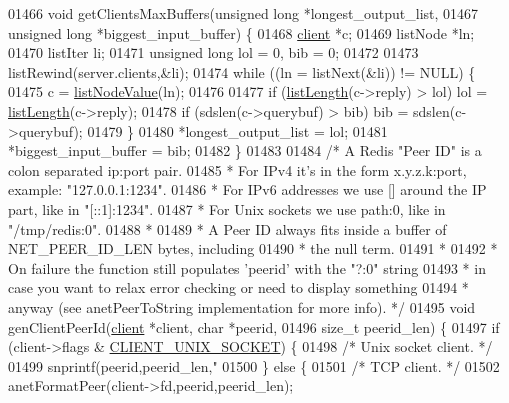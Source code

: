 \begin{DoxyCode}
{{{{{{{{{{{{{{{{{01466 \textcolor{keywordtype}{void} getClientsMaxBuffers(\textcolor{keywordtype}{unsigned} \textcolor{keywordtype}{long} *longest\_output\_list,
01467                           \textcolor{keywordtype}{unsigned} \textcolor{keywordtype}{long} *biggest\_input\_buffer) \{
01468     \hyperlink{structclient}{client} *c;
01469     listNode *ln;
01470     listIter li;
01471     \textcolor{keywordtype}{unsigned} \textcolor{keywordtype}{long} lol = 0, bib = 0;
01472 
01473     listRewind(server.clients,&li);
01474     \textcolor{keywordflow}{while} ((ln = listNext(&li)) != NULL) \{
01475         c = \hyperlink{adlist_8h_af84cae230e7180ebcda1e2736fce9f65}{listNodeValue}(ln);
01476 
01477         \textcolor{keywordflow}{if} (\hyperlink{adlist_8h_afde0ab079f934670e82119b43120e94b}{listLength}(c->reply) > lol) lol = \hyperlink{adlist_8h_afde0ab079f934670e82119b43120e94b}{listLength}(c->reply);
01478         \textcolor{keywordflow}{if} (sdslen(c->querybuf) > bib) bib = sdslen(c->querybuf);
01479     \}
01480     *longest\_output\_list = lol;
01481     *biggest\_input\_buffer = bib;
01482 \}
01483 
01484 \textcolor{comment}{/* A Redis "Peer ID" is a colon separated ip:port pair.}
01485 \textcolor{comment}{ * For IPv4 it's in the form x.y.z.k:port, example: "127.0.0.1:1234".}
01486 \textcolor{comment}{ * For IPv6 addresses we use [] around the IP part, like in "[::1]:1234".}
01487 \textcolor{comment}{ * For Unix sockets we use path:0, like in "/tmp/redis:0".}
01488 \textcolor{comment}{ *}
01489 \textcolor{comment}{ * A Peer ID always fits inside a buffer of NET\_PEER\_ID\_LEN bytes, including}
01490 \textcolor{comment}{ * the null term.}
01491 \textcolor{comment}{ *}
01492 \textcolor{comment}{ * On failure the function still populates 'peerid' with the "?:0" string}
01493 \textcolor{comment}{ * in case you want to relax error checking or need to display something}
01494 \textcolor{comment}{ * anyway (see anetPeerToString implementation for more info). */}
01495 \textcolor{keywordtype}{void} genClientPeerId(\hyperlink{structclient}{client} *client, \textcolor{keywordtype}{char} *peerid,
01496                             size\_t peerid\_len) \{
01497     \textcolor{keywordflow}{if} (client->flags & \hyperlink{server_8h_ae19f45757ef3ffb2f3abb86cbc3b67a2}{CLIENT\_UNIX\_SOCKET}) \{
01498         \textcolor{comment}{/* Unix socket client. */}
01499         snprintf(peerid,peerid\_len,\textcolor{stringliteral}{"%
01500     \} \textcolor{keywordflow}{else} \{
01501         \textcolor{comment}{/* TCP client. */}
01502         anetFormatPeer(client->fd,peerid,peerid\_len);
}}}}}}}}}}}}}}}}}}
\end{DoxyCode}
